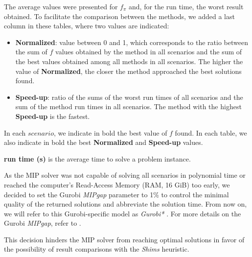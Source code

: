 \documentclass[preprint]{elsarticle}
\begin{document}
The average values were presented for $f_{\pi}$\/ and, for the run time, the worst result obtained. To facilitate the comparison between the methods, we added a last column in these tables, where two values are indicated:
\begin{itemize}
	\item {\bf Normalized}: value between 0 and 1, which corresponds to the ratio between the sum of $f$\/ values obtained by the method in all scenarios and the sum of the best values obtained among all methods in all scenarios. The higher the value of {\bf Normalized}, the closer the method approached the best solutions found.
	\item {\bf Speed-up}: ratio of the sums of the worst run times of all scenarios and the sum of the method run times in all scenarios. The method with the highest {\bf Speed-up}\/ is the fastest.
\end{itemize}

In each $scenario$\/, we indicate in bold the best value of $f$\/ found. In each table, we also indicate in bold the best {\bf Normalized}\/ and {\bf Speed-up}\/ values.

{\color{blue}
{\bf run time (s)} is the average time to solve a problem instance.

As the MIP solver was not capable of solving all scenarios in polynomial time or reached the computer's Read-Access Memory (RAM, 16 GiB) too early, we decided to set the Gurobi {\it MIPgap} parameter to 1\% to control the minimal quality of the returned solutions and abbreviate the solution time.
From now on, we will refer to this Gurobi-specific model as {\it Gurobi* }.
For more details on the Gurobi {\it MIPgap}, refer to \cite{mipgap}.

This decision hinders the MIP solver from reaching optimal solutions in favor of the possibility of result comparisons with the {\it Shims} heuristic.

}
\end{document}
